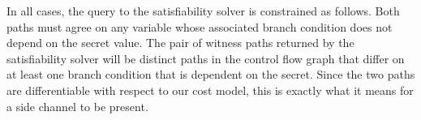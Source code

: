 

In all cases, the query to the satisfiability solver is constrained as follows. Both paths must agree on any variable whose associated branch condition does not depend on the secret value. The pair of witness paths returned by the satisfiability solver will be distinct paths in the control flow graph that differ on at least one branch condition that is dependent on the secret. Since the two paths are differentiable with respect to our cost model, this is exactly what it means for a side channel to be present. 

